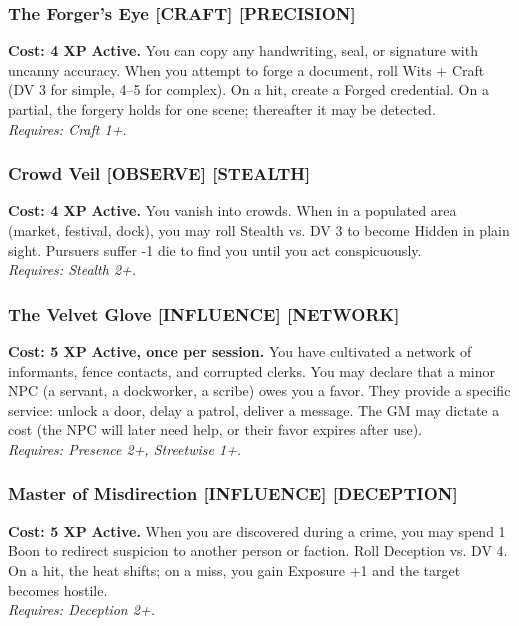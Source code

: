 \subsubsection*{The Forger's Eye \textnormal{[CRAFT] [PRECISION]}}
\label{talent:forgers-eye}
\textbf{Cost: 4 XP} \textbf{Active.} You can copy any handwriting, seal, or signature with uncanny accuracy. When you attempt to forge a document, roll Wits + Craft (DV 3 for simple, 4--5 for complex). On a hit, create a Forged credential. On a partial, the forgery holds for one scene; thereafter it may be detected. \\
\textit{Requires: Craft 1+.}

\subsubsection*{Crowd Veil \textnormal{[OBSERVE] [STEALTH]}}
\label{talent:crowd-veil}
\textbf{Cost: 4 XP} \textbf{Active.} You vanish into crowds. When in a populated area (market, festival, dock), you may roll Stealth vs. DV 3 to become Hidden in plain sight. Pursuers suffer -1 die to find you until you act conspicuously. \\
\textit{Requires: Stealth 2+.}

\subsubsection*{The Velvet Glove \textnormal{[INFLUENCE] [NETWORK]}}
\label{talent:velvet-glove}
\textbf{Cost: 5 XP} \textbf{Active, once per session.} You have cultivated a network of informants, fence contacts, and corrupted clerks. You may declare that a minor NPC (a servant, a dockworker, a scribe) owes you a favor. They provide a specific service: unlock a door, delay a patrol, deliver a message. The GM may dictate a cost (the NPC will later need help, or their favor expires after use). \\
\textit{Requires: Presence 2+, Streetwise 1+.}

\subsubsection*{Master of Misdirection \textnormal{[INFLUENCE] [DECEPTION]}}
\label{talent:master-of-misdirection}
\textbf{Cost: 5 XP} \textbf{Active.} When you are discovered during a crime, you may spend 1 Boon to redirect suspicion to another person or faction. Roll Deception vs. DV 4. On a hit, the heat shifts; on a miss, you gain Exposure +1 and the target becomes hostile. \\
\textit{Requires: Deception 2+.}

